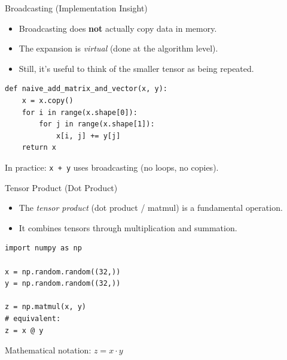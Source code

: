 \documentclass{beamer}
\begin{document}
\begin{frame}[fragile]{Broadcasting (Implementation Insight)}
    \begin{itemize}
        \item Broadcasting does \textbf{not} actually copy data in memory.
        \item The expansion is \textit{virtual} (done at the algorithm level).
        \item Still, it’s useful to think of the smaller tensor as being repeated.
    \end{itemize}

    \begin{center}
        \begin{tcolorbox}[
                width=0.75\textwidth,
                colback=gray!5,
                colframe=gray!60,
                boxrule=0.4pt,
                arc=3pt,
                left=6pt,right=6pt,top=6pt,bottom=6pt
            ]
            \begin{verbatim}
def naive_add_matrix_and_vector(x, y):
    x = x.copy()
    for i in range(x.shape[0]):
        for j in range(x.shape[1]):
            x[i, j] += y[j]
    return x
\end{verbatim}
        \end{tcolorbox}
    \end{center}

    \vspace{0.5em}
    \small In practice: \texttt{x + y} uses broadcasting (no loops, no copies).
\end{frame}

\begin{frame}[fragile]{Tensor Product (Dot Product)}
    \begin{itemize}
        \item The \textit{tensor product} (dot product / matmul) is a fundamental operation.
        \item It combines tensors through multiplication and summation.
    \end{itemize}

    \begin{center}
        \begin{tcolorbox}[
                width=0.75\textwidth,
                colback=gray!5,
                colframe=gray!60,
                boxrule=0.4pt,
                arc=3pt,
                left=6pt,right=6pt,top=6pt,bottom=6pt
            ]
            \begin{verbatim}
import numpy as np

x = np.random.random((32,))
y = np.random.random((32,))

z = np.matmul(x, y)
# equivalent:
z = x @ y
\end{verbatim}
        \end{tcolorbox}
    \end{center}

    \vspace{0.5em}
    \small Mathematical notation: $z = x \cdot y$
\end{frame}
\end{document}
